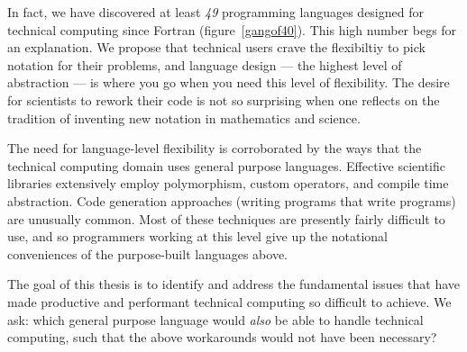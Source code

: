 In fact, we have discovered at least \emph{49} programming languages
designed for technical computing since Fortran (figure~\ref{gangof40}).
This high number begs for an explanation.
We propose that technical users crave the flexibiltiy to pick notation
for their problems, and language design --- the highest level of
abstraction --- is where you go when you need this level of flexibility.
The desire for scientists to rework their code is not so surprising when one reflects
on the tradition of inventing new notation in mathematics and science.

The need for language-level flexibility is corroborated by
the ways that the technical computing domain uses general purpose
languages.
Effective scientific libraries extensively employ
polymorphism, custom operators, and compile time abstraction.
Code generation approaches (writing programs that write programs)
are unusually common.
Most of these techniques are presently fairly difficult to use, and so
programmers working at this level give up the notational conveniences
of the purpose-built languages above.

The goal of this thesis is to identify and address the fundamental
issues that have made productive and performant technical computing
so difficult to achieve.
We ask: which general purpose language would \emph{also} be able to handle
technical computing, such that the above workarounds would not have
been necessary?


\iffalse
Compiler techniques, library design, high-performance
computational kernels, new algorithms, and approaches to parallelism are
all important to technical computing.
However these sorts of technologies can usually be applied to multiple
languages, as has happened in the C and Fortran language families.
However in conjunction with a new language, these technologies can flourish.
Indeed, we believe that language design
has reached a level of importance that even (perhaps temporarily) supersedes
the traditional focus of cache utilization and the use of matrix operations.
\fi

